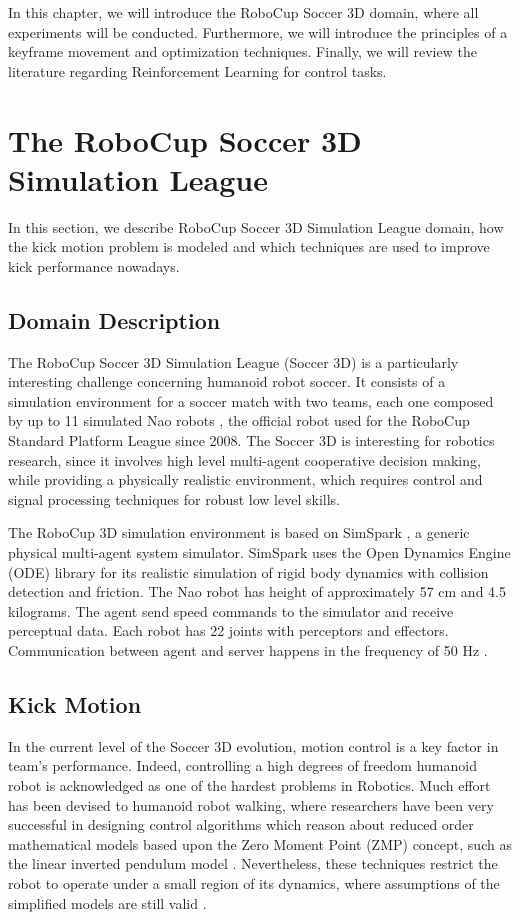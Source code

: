 In this chapter, we will introduce the RoboCup Soccer 3D domain, where all experiments will be conducted. Furthermore, we will introduce the principles of a keyframe movement and optimization techniques. Finally, we will review the literature regarding Reinforcement Learning for control tasks.

\section{The RoboCup Soccer 3D Simulation League}

In this section, we describe RoboCup Soccer 3D Simulation League domain, how the kick motion problem is modeled and which techniques are used to improve kick performance nowadays.

\subsection{Domain Description}
The RoboCup Soccer 3D Simulation League (Soccer 3D) is a particularly interesting challenge concerning humanoid robot soccer. It consists of a simulation environment for a soccer match with two teams, each one composed by up to 11 simulated Nao robots \cite{gouaillier2009}, the official robot used for the RoboCup Standard Platform League since 2008. The Soccer 3D is interesting for robotics research, since it involves high level multi-agent cooperative decision making, while providing a physically realistic environment, which requires control and signal processing techniques for robust low level skills.

The RoboCup 3D simulation environment is based on SimSpark \cite{simspark}, a generic
physical multi-agent system simulator. SimSpark uses the Open Dynamics Engine (ODE) library for its realistic simulation of rigid body dynamics with
collision detection and friction. The Nao robot has height of approximately 57 cm and 4.5 kilograms. The agent send speed commands to the simulator and receive perceptual data. Each robot has 22 joints with perceptors and effectors. Communication between agent and server happens in the frequency of 50 Hz \cite{AAAI12-MacAlpine}. 

\subsection{ Kick Motion }
In the current level of the Soccer 3D evolution, motion control is a key factor in team's performance. Indeed, controlling a high degrees of freedom humanoid robot is acknowledged as one of the hardest problems in Robotics. Much effort has been devised to humanoid robot walking, where researchers have been very successful in designing control algorithms which reason about reduced order mathematical models based upon the Zero Moment Point (ZMP) concept, such as the linear inverted pendulum model \cite{kajita2001}. Nevertheless, these techniques restrict the robot to operate under a small region of its dynamics, where assumptions of the simplified models are still valid \cite{collins2005,muniz2016}.

